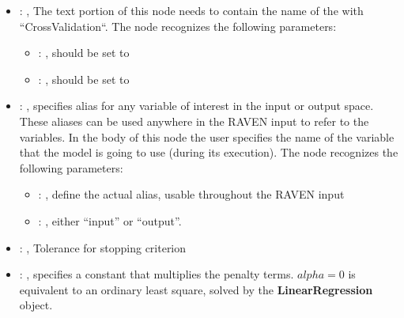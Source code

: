\begin{itemize}
\begin{itemize}
        \item {}: ,
          List of IDs of features/variables to include in the transformation process.

        \item {}: ,
          Which space to search? Target or Feature?
      \end{itemize}

    \item {}: ,
      The text portion of this node needs to contain the name of the  with
               ``CrossValidation``.
      The  node recognizes the following parameters:
        \begin{itemize}
          \item {}: ,
            should be set to 
          \item {}: ,
            should be set to 
      \end{itemize}

    \item {}: ,
      specifies alias for         any variable of interest in the input or output space. These
      aliases can be used anywhere in the RAVEN input to         refer to the variables. In the body
      of this node the user specifies the name of the variable that the model is going to use
      (during its execution).
      The  node recognizes the following parameters:
        \begin{itemize}
          \item {}: ,
            define the actual alias, usable throughout the RAVEN input
          \item {}: ,
            either ``input'' or ``output''.
      \end{itemize}

    \item {}: ,
      Tolerance for stopping criterion

    \item {}: ,
      specifies a constant                                                  that multiplies the
      penalty terms.                                                  $alpha = 0$ is equivalent to
      an ordinary least square, solved by the
      \textbf{LinearRegression} object.


\end{itemize}
